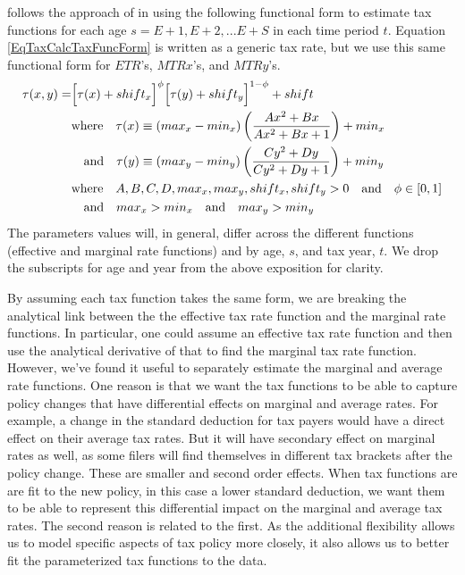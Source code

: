   \ogindia follows the approach of \citet{DeBackerEtAl:2017} in using the following functional form to estimate tax functions for each age $s=E+1, E+2, ... E+S$ in each time period $t$. Equation \ref{EqTaxCalcTaxFuncForm} is written as a generic tax rate, but we use this same functional form for $ETR$'s, $MTRx$'s, and $MTRy$'s.
  \begin{equation}\label{EqTaxCalcTaxFuncForm}
    \begin{split}
      \tau(x,y) = &\Bigl[\tau(x) + shift_x\Bigr]^\phi\Bigl[\tau(y) + shift_y\Bigr]^{1-\phi} + shift \\
      &\text{where}\quad \tau(x) \equiv (max_x - min_x)\left(\frac{Ax^2 + Bx}{Ax^2 + Bx + 1}\right) + min_x \\
      &\quad\text{and}\quad \tau(y) \equiv (max_y - min_y)\left(\frac{Cy^2 + Dy}{Cy^2 + Dy + 1}\right) + min_y \\
      &\text{where}\quad A,B,C,D,max_x,max_y,shift_x,shift_y > 0 \quad\text{and}\quad\phi\in[0,1] \\
      &\quad\text{and}\quad max_x > min_x \quad\text{and}\quad max_y > min_y
    \end{split}
  \end{equation}
  The parameters values will, in general, differ across the different functions (effective and marginal rate functions) and by age, $s$, and tax year, $t$.  We drop the subscripts for age and year from the above exposition for clarity.

  By assuming each tax function takes the same form, we are breaking the analytical link between the the effective tax rate function and the marginal rate functions.  In particular, one could assume an effective tax rate function and then use the analytical derivative of that to find the marginal tax rate function.  However, we've found it useful to separately estimate the marginal and average rate functions.  One reason is that we want the tax functions to be able to capture policy changes that have differential effects on marginal and average rates.  For example, a change in the standard deduction for tax payers would have a direct effect on their average tax rates.  But it will have secondary effect on marginal rates as well, as some filers will find themselves in different tax brackets after the policy change. These are smaller and second order effects. When tax functions are are fit to the new policy, in this case a lower standard deduction, we want them to be able to represent this differential impact on the marginal and average tax rates. The second reason is related to the first. As the additional flexibility allows us to model specific aspects of tax policy more closely, it also allows us to better fit the parameterized tax functions to the data.

